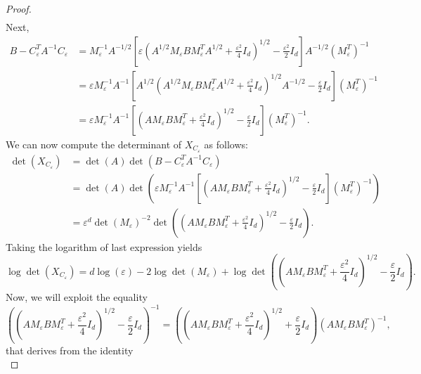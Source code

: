 \documentclass[]{article}
\numberwithin{equation}{section}
\theoremstyle{plain}
\begin{document}
\begin{proof}
\begin{align*}
\end{align*}
Next, 
\begin{align*}
    B - C_\varepsilon^TA^{-1} C_\varepsilon &=  M_{\varepsilon}^{-1}A^{-1/2}\left[\varepsilon \left(A^{1/2}M_{\varepsilon}B M_{\varepsilon}^TA^{1/2}+ \frac{\varepsilon^2}{4}I_d \right)^{1/2} -  \frac{\varepsilon^2}{2}I_d  \right]A^{-1/2} (M_{\varepsilon}^T)^{-1} \\
    & = \varepsilon M_{\varepsilon}^{-1}A^{-1}\left[ A^{1/2}\left(A^{1/2}M_{\varepsilon}B M_{\varepsilon}^TA^{1/2}+ \frac{\varepsilon^2}{4}I_d \right)^{1/2}A^{-1/2} - \frac{\varepsilon}{2}I_d\right] (M_{\varepsilon}^T)^{-1} \\
    & = \varepsilon M_{\varepsilon}^{-1}A^{-1}\left[ \left(AM_{\varepsilon}B M_{\varepsilon}^T+ \frac{\varepsilon^2}{4}I_d \right)^{1/2} - \frac{\varepsilon}{2}I_d \right] (M_{\varepsilon}^T)^{-1}.
\end{align*}
We can now compute the determinant of $X_{C_\varepsilon}$ as follows:
\begin{align*}
    \det(X_{C_\varepsilon}) & = \det(A)\det(B - C_\varepsilon^TA^{-1} C_\varepsilon) \\
    & = \det(A) \det\left(\varepsilon M_{\varepsilon}^{-1}A^{-1}\left[ \left(AM_{\varepsilon}B M_{\varepsilon}^T+ \frac{\varepsilon^2}{4}I_d \right)^{1/2} - \frac{\varepsilon}{2}I_d \right] (M_{\varepsilon}^T)^{-1}\right) \\
    & = \varepsilon^{d}\det(M_{\varepsilon})^{-2}\det\left( \left(AM_{\varepsilon}B M_{\varepsilon}^T+ \frac{\varepsilon^2}{4}I_d \right)^{1/2}- \frac{\varepsilon}{2}I_d\right).
\end{align*}
Taking the logarithm of last expression yields
\begin{equation}
    \log\det(X_{C_\varepsilon}) = d\log(\varepsilon) - 2\log\det(M_{\varepsilon}) + \log\det\left( \left(AM_{\varepsilon}B M_{\varepsilon}^T+ \frac{\varepsilon^2}{4}I_d \right)^{1/2}- \frac{\varepsilon}{2}I_d\right).
\end{equation}
Now, we will exploit the equality 
\begin{equation*}
    \left( \left(AM_{\varepsilon}B M_{\varepsilon}^T+ \frac{\varepsilon^2}{4}I_d \right)^{1/2}- \frac{\varepsilon}{2}I_d\right)^{-1} = \left( \left(AM_{\varepsilon}B M_{\varepsilon}^T+ \frac{\varepsilon^2}{4}I_d \right)^{1/2} +\frac{\varepsilon}{2}I_d\right) (AM_{\varepsilon}BM_{\varepsilon}^T)^{-1},
\end{equation*}
that derives from the identity
\begin{equation}

\end{equation}
\end{proof}
\end{document}
